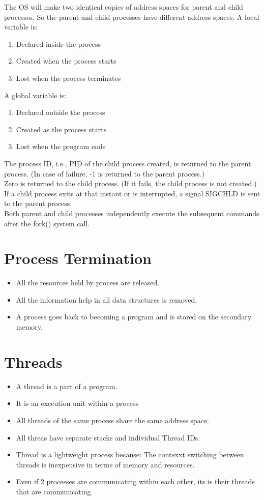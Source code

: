 \documentclass[11pt]{article}
\begin{document}
The OS will make two identical copies of address spaces for parent and child processes. So the parent and child processes have different address spaces.
A local variable is:
\begin{enumerate}
	\item Declared inside the process
	\item  Created when the process starts
	\item  Lost when the process terminates
\end{enumerate}

A global variable is:
\begin{enumerate}
	\item Declared outside the process
	\item Created as the process starts
	\item Lost when the program ends
\end{enumerate}

The process ID, i.e., PID of the child process created, is returned to the parent process. (In case of failure, -1 is returned to the parent process.) \\
Zero is returned to the child process. (If it fails, the child process is not created.) If a child process exits at that instant or is interrupted, a signal SIGCHLD is sent to the parent process. \\
Both parent and child processes independently execute the subsequent commands after the fork() system call.


\section{Process Termination}
\begin{itemize}
	\item All the resources held by process are released.
	\item All the information help in all data structures is removed.
	\item A process goes back to becoming a program and is stored on the secondary memory.
\end{itemize}


\section{Threads}
\begin{itemize}
	\item A thread is a part of a program.
	\item It is an execution unit within a process
	\item All threads of the same process share the same address space.
	\item All threas have separate stacks and individual Thread IDs.
	\item Thread is a lightweight process because: The contexxt switching between threads is inexpensive in terms of memory and resources.
	\item Even if 2 processes are communicating within each other, its is their threads that are communicating.
\end{itemize}
\end{document}
